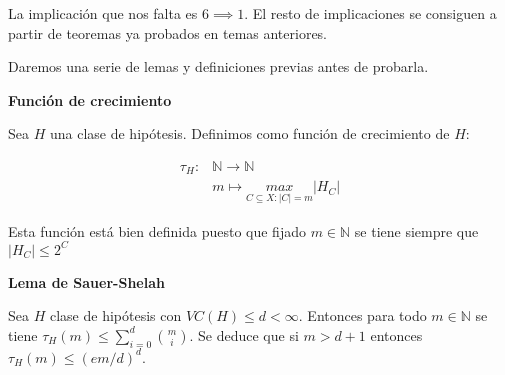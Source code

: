 La implicación que nos falta es $6 \implies 1$. El resto de implicaciones se consiguen a partir de teoremas ya probados en temas anteriores.

Daremos una serie de lemas y definiciones previas antes de probarla.

\begin{definition}
\textbf{Función de crecimiento}

Sea $H$ una clase de hipótesis. Definimos como función de crecimiento de $H$:

\[\begin{array}{ll}
\tau_{H}: & \mathbb{N} \rightarrow \mathbb{N}\\
                    & m          \mapsto     \underset{C \subseteq X: |C|=m}{max}{|H_C|}
\end{array}\]

Esta función está bien definida puesto que fijado $m \in \mathbb{N}$ se tiene siempre que $|H_C| \le 2^C$
\end{definition}

\begin{lemma}
\textbf{Lema de Sauer-Shelah}

Sea $H$ clase de hipótesis con $VC(H) \le d < \infty$. Entonces para todo $m\in \mathbb{N}$ se tiene $\tau_{H} (m) \le \sum_{i=0}^d \binom{m}{i}$. Se deduce que si $m > d+1$ entonces $\tau_{H}(m) \le (em/d)^d$.
\end{lemma}


